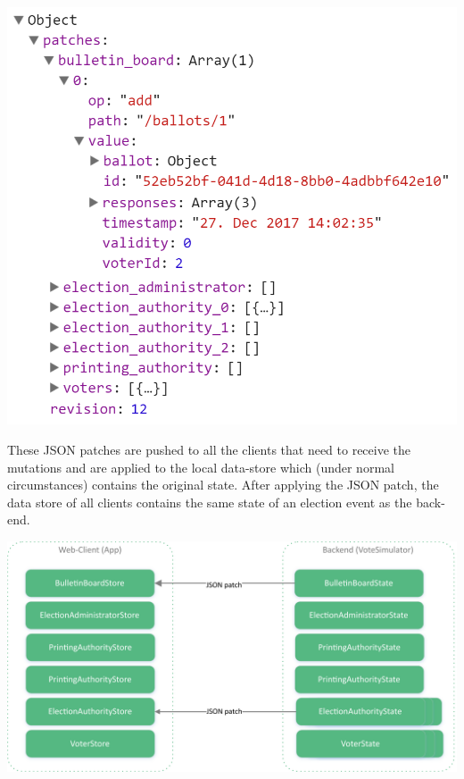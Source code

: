 \begin{center}
\includegraphics[scale=0.6]{assets/jsonpatchexample.png}
\label{JSON Patch example}%
\end{center}
These JSON patches are pushed to all the clients that need to receive the mutations and are applied to the local data-store which (under normal circumstances) contains the original state. After applying the JSON patch, the data store of all clients contains the same state of an election event as the back-end.

\begin{center}
\includegraphics[scale=0.62]{assets/DatastoresJsonPatch.pdf}
\label{Data-Sync with JSON Patches}%
\end{center}

